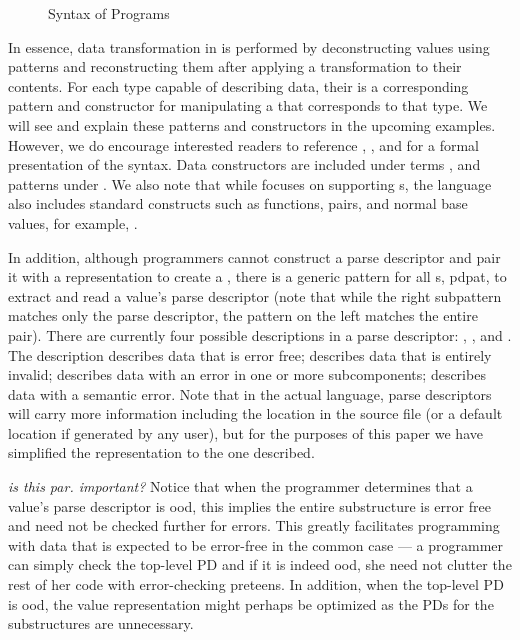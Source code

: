\documentclass{entcs}
\begin{document}
\begin{figure}
  \centering
  
  \caption{Syntax of Programs}
  \label{fig:syntax-prog}
\end{figure}

In essence, data transformation in \datatype{} is performed by
deconstructing values using patterns and reconstructing them after
applying a transformation to their contents. For each type capable of
describing data, their is a corresponding pattern and constructor for
manipulating a \pvalue{} that corresponds to that type. We will see
and explain these patterns and constructors in the upcoming examples.
However, we do encourage interested readers to reference
, ,
 and  for a formal
presentation of the syntax. Data constructors are included under terms
, and patterns under . We also note that while
\datatype{} focuses on supporting \pvalue{}s, the language also
includes standard constructs such as functions, pairs, and normal base
values, for example, .

In addition, although programmers cannot construct a parse descriptor
and pair it with a representation to create a \pvalue{}, there is a
generic pattern for all \pvalue{}s,  {pdpat}, to
extract and read a value's parse descriptor (note that while the right
subpattern matches only the parse descriptor, the pattern on the left
matches the entire pair). There are currently four possible
descriptions in a parse descriptor: \pdgood{}, \pdbad{},\pdnest{} and
\pdsem{}. The description \pdgood{} describes data that is error free;
\pdbad{} describes data that is entirely invalid; \pdnest{} describes
data with an error in one or more subcomponents; \pdsem{} describes
data with a semantic error.  Note that in the actual language, parse
descriptors will carry more information including the location in the
source file (or a default location if generated by any user), but for
the purposes of this paper we have simplified the representation to
the one described.

{\em is this par. important?}
Notice that when the programmer
determines that a value's parse descriptor is ood, this implies
the entire substructure is error free and need not be checked further
for errors.  This greatly facilitates programming with data that is
expected to be error-free in the common case --- a programmer can
simply check the top-level PD and if it is indeed ood, she need
not clutter the rest of her code with error-checking preteens.  In
addition, when the top-level PD is ood, the value representation
might perhaps be optimized as the PDs for the substructures are
unnecessary.
  
\end{document}
